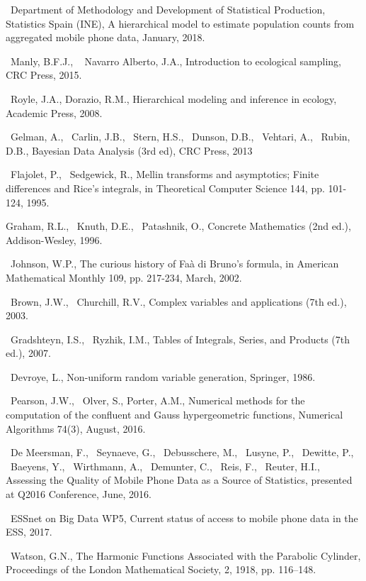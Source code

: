 \documentclass[12pt, a4paper]{article}
\begin{document}
\begin{thebibliography}{99}

~Department of Methodology and Development of Statistical Production, Statistics Spain (INE), 
A hierarchical model to estimate population counts from
aggregated mobile phone data, January, 2018.

~Manly, B.F.J., ~ Navarro Alberto, J.A., Introduction to ecological sampling,
CRC Press, 2015.

~Royle, J.A., Dorazio, R.M., Hierarchical modeling and inference in ecology,
Academic Press, 2008.

~Gelman, A., ~Carlin, J.B., ~Stern, H.S., ~Dunson, D.B., ~Vehtari, A., ~Rubin, D.B., Bayesian Data Analysis (3rd ed), CRC Press, 2013

~Flajolet, P., ~Sedgewick, R.,  Mellin transforms and asymptotics; Finite differences and Rice's integrals,
in  Theoretical Computer Science 144, pp. 101-124, 1995.

Graham, R.L., ~Knuth, D.E., ~Patashnik, O., Concrete Mathematics (2nd ed.), 
Addison-Wesley, 1996.

~Johnson, W.P., The curious history of Faà di Bruno's formula, in 
American Mathematical Monthly 109, pp. 217-234, March, 2002.

~Brown, J.W., ~Churchill, R.V., Complex variables and applications (7th ed.), 2003.

~Gradshteyn, I.S., ~Ryzhik, I.M., Tables of Integrals, Series, and Products (7th ed.),
2007.

~Devroye, L., Non-uniform random variable generation, Springer, 1986.


~Pearson, J.W., ~Olver, S., Porter, A.M., Numerical methods for the computation of the confluent and Gauss 
hypergeometric functions, Numerical Algorithms 74(3), August, 2016.

~De Meersman, F., ~Seynaeve, G., ~Debusschere, M., ~Lusyne, P., ~Dewitte, P., 
~Baeyens, Y., ~Wirthmann, A., ~Demunter, C., ~Reis, F., ~Reuter, H.I.,
Assessing the Quality of Mobile Phone Data as a Source of Statistics,
presented at Q2016 Conference, June, 2016.

~ESSnet on Big Data WP5, Current status of access to mobile phone data in the ESS, 2017.
 
~Watson, G.N., The Harmonic Functions Associated with the Parabolic Cylinder, Proceedings
 of the London Mathematical Society, 2, 1918, pp. 116–148.
\end{thebibliography}
\end{document}
